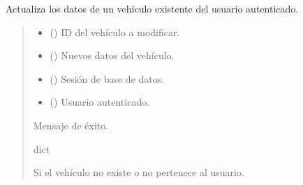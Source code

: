\documentclass[letterpaper,10pt,spanish]{sphinxmanual}
\begin{document}
\begin{fulllineitems}
\label{\detokenize{modelos:main.editar_vehiculo}}
\pysigstartsignatures
\pysiglinewithargsret
{}
{\sphinxparamcomma {}\sphinxparamcomma {}\sphinxparamcomma {}}
{}
\pysigstopsignatures
\sphinxAtStartPar
Actualiza los datos de un vehículo existente del usuario autenticado.
\begin{quote}\begin{description}
\begin{itemize}
\item {} 
\sphinxAtStartPar
{} () \textendash{} ID del vehículo a modificar.

\item {} 
\sphinxAtStartPar
{} () \textendash{} Nuevos datos del vehículo.

\item {} 
\sphinxAtStartPar
{} () \textendash{} Sesión de base de datos.

\item {} 
\sphinxAtStartPar
{} ({\hyperref[\detokenize{modelos:main.Usuario}]{}}) \textendash{} Usuario autenticado.

\end{itemize}

\sphinxAtStartPar
Mensaje de éxito.

\sphinxAtStartPar
dict

\sphinxAtStartPar
{} \textendash{} Si el vehículo no existe o no pertenece al usuario.

\end{description}\end{quote}

\end{fulllineitems}
\end{document}

